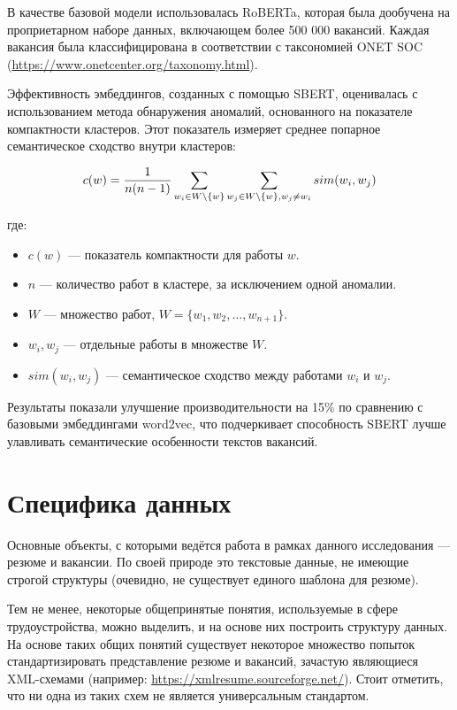 \documentclass[14pt]{mmcs_article}
\begin{document}
В качестве базовой модели использовалась RoBERTa, которая была дообучена на проприетарном наборе данных, включающем более 500 000 вакансий. Каждая вакансия была классифицирована в соответствии с таксономией ONET SOC (\url{https://www.onetcenter.org/taxonomy.html}).

Эффективность эмбеддингов, созданных с помощью SBERT, оценивалась
с использованием метода обнаружения аномалий, основанного на показателе компактности кластеров. Этот показатель измеряет среднее попарное семантическое сходство внутри кластеров:

\begin{equation}
  \label{eq:compactness_cluster}
  \centering
  \allowdisplaybreaks[1]
  \begin{split}
    c(w) = \frac{1}{n(n-1)} \sum_{w_i \in W \setminus \{w\}} \sum_{w_j \in W \setminus \{w\}, w_j \neq w_i} sim(w_i, w_j)
  \end{split}
\end{equation}

где:
\begin{itemize}
  \item \( c(w) \) — показатель компактности для работы \( w \).
  \item \( n \) — количество работ в кластере, за исключением одной аномалии.
  \item \( W \) — множество работ, \( W = \{w_1, w_2, \ldots, w_{n+1}\} \).
  \item \( w_i, w_j \) — отдельные работы в множестве \( W \).
  \item \( sim(w_i, w_j) \) — семантическое сходство между работами \( w_i \) и \( w_j \).
\end{itemize}

Результаты показали улучшение производительности на 15\% по сравнению с базовыми эмбеддингами word2vec, что подчеркивает способность SBERT лучше улавливать семантические особенности текстов вакансий.


\newpage
\section{Специфика данных}\label{data_specification}

Основные объекты, с которыми ведётся работа в рамках данного исследования --- резюме и вакансии. По своей природе это текстовые данные, не имеющие строгой структуры (очевидно, не существует единого шаблона для резюме).

Тем не менее, некоторые общепринятые понятия, используемые в сфере трудоустройства, можно выделить, и на основе них построить структуру данных. На основе таких общих понятий существует некоторое множество попыток стандартизировать представление резюме и вакансий, зачастую являющиеся XML-схемами (например: \url{https://xmlresume.sourceforge.net/}). Стоит отметить, что ни одна из таких схем не является универсальным стандартом.
\end{document}
